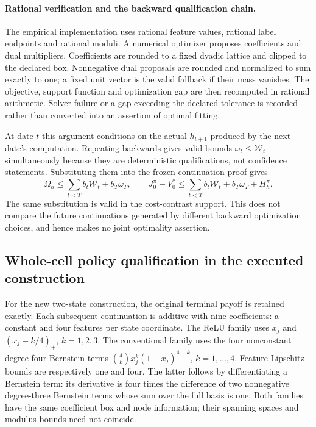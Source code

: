 \paragraph{Rational verification and the backward qualification chain.}
The empirical implementation uses rational feature values, rational label endpoints and rational moduli. A numerical optimizer proposes coefficients and dual multipliers. Coefficients are rounded to a fixed dyadic lattice and clipped to the declared box. Nonnegative dual proposals are rounded and normalized to sum exactly to one; a fixed unit vector is the valid fallback if their mass vanishes. The objective, support function and optimization gap are then recomputed in rational arithmetic. Solver failure or a gap exceeding the declared tolerance is recorded rather than converted into an assertion of optimal fitting.

At date $t$ this argument conditions on the actual $h_{t+1}$ produced by the next date's computation. Repeating backwards gives valid bounds $\omega_t\le\mathcal W_t$ simultaneously because they are deterministic qualifications, not confidence statements. Substituting them into the frozen-continuation proof gives
\[
 \Omega_h\le\sum_{t<T}b_t\mathcal W_t+b_T\omega_T,
 \qquad J_0^\pi-V_0^*\le\sum_{t<T}b_t\mathcal W_t+b_T\omega_T+H_h^\pi.
\]
The same substitution is valid in the cost-contrast support. This does not compare the future continuations generated by different backward optimization choices, and hence makes no joint optimality assertion.

\subsection{Whole-cell policy qualification in the executed construction}\label{supp:construction73}
For the new two-state construction, the original terminal payoff is retained exactly. Each subsequent continuation is additive with nine coefficients: a constant and four features per state coordinate. The ReLU family uses $x_j$ and $(x_j-k/4)_+$, $k=1,2,3$. The conventional family uses the four nonconstant degree-four Bernstein terms $\binom4k x_j^k(1-x_j)^{4-k}$, $k=1,\ldots,4$. Feature Lipschitz bounds are respectively one and four. The latter follows by differentiating a Bernstein term: its derivative is four times the difference of two nonnegative degree-three Bernstein terms whose sum over the full basis is one. Both families have the same coefficient box and node information; their spanning spaces and modulus bounds need not coincide.

